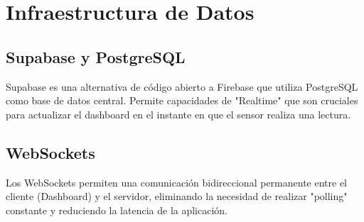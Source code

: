 \section{Infraestructura de Datos}

\subsection{Supabase y PostgreSQL}
Supabase es una alternativa de código abierto a Firebase que utiliza PostgreSQL como base de datos central. Permite capacidades de "Realtime" que son cruciales para actualizar el dashboard en el instante en que el sensor realiza una lectura.

\subsection{WebSockets}
Los WebSockets permiten una comunicación bidireccional permanente entre el cliente (Dashboard) y el servidor, eliminando la necesidad de realizar "polling" constante y reduciendo la latencia de la aplicación.
